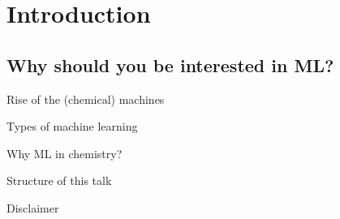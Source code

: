 \section{Introduction}
\subsection{Why should you be interested in ML?}
\begin{frame}[t]{Rise of the (chemical) machines}

\end{frame}

\begin{frame}[t]{Types of machine learning}

\end{frame}
\begin{frame}[t]{Why ML in chemistry?}

\end{frame}

\begin{frame}[t]{Structure of this talk}

\end{frame}

\begin{frame}[t]{Disclaimer}

\end{frame}